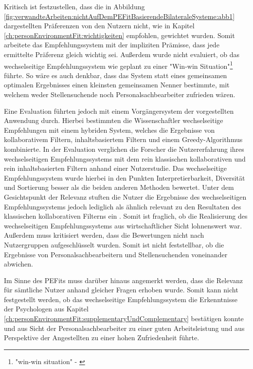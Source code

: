 Kritisch ist festzustellen, dass die in Abbildung \ref{fig:verwandteArbeiten:nichtAufDemPEFitBasierendeBilateraleSysteme:abb1} dargestellten Präferenzen von den Nutzern nicht, wie in Kapitel \ref{ch:personEnvironmentFit:wichtigkeiten} empfohlen, gewichtet wurden. Somit arbeitete das Empfehlungssystem mit der impliziten Prämisse, dass jede ermittelte Präferenz gleich wichtig sei. Außerdem wurde nicht evaluiert, ob das wechselseitige Empfehlungssystem wie geplant zu einer "Win-win Situation"\footnote{"win-win situation" - \textcite[S. 3, Z. 45f.]{wenxing:2015}} \cite[S. 3, Z. 45f.]{wenxing:2015} führte. So wäre es auch denkbar, dass das System statt eines gemeinsamen optimalen Ergebnisses einen kleinsten gemeinsamen Nenner bestimmte, mit welchem weder Stellensuchende noch Personalsachbearbeiter zufrieden wären.

Eine Evaluation führten jedoch \textcite[S. 1ff.]{hong:2013b} mit einem Vorgängersystem der vorgestellten Anwendung durch. Hierbei bestimmten die Wissenschaftler wechselseitige Empfehlungen mit einem hybriden System, welches die Ergebnisse von kollaborativem Filtern, inhaltsbasiertem Filtern und einem Greedy-Algorithmus kombinierte. In der Evaluation verglichen die Forscher die Nutzererfahrung ihres wechselseitigen Empfehlungssystems mit dem rein klassischen kollaborativen und rein inhaltsbasierten Filtern anhand einer Nutzerstudie. Das wechselseitige Empfehlungssystem wurde hierbei in den Punkten Interpretierbarkeit, Diversität und Sortierung besser als die beiden anderen Methoden bewertet. Unter dem Gesichtspunkt der Relevanz stuften die Nutzer die Ergebnisse des wechselseitigen Empfehlungssystems jedoch lediglich als ähnlich relevant zu den Resultaten des klassischen kollaborativen Filterns ein \cite[S. 1ff.]{hong:2013b}. Somit ist fraglich, ob die Realisierung des wechselseitigen Empfehlungssystems aus wirtschaftlicher Sicht lohnenswert war. Außerdem muss kritisiert werden, dass die Bewertungen nicht nach Nutzergruppen aufgeschlüsselt wurden. Somit ist nicht feststellbar, ob die Ergebnisse von Personalsachbearbeitern und Stellensuchenden voneinander abwichen.

Im Sinne des \acp{PEFit} muss darüber hinaus angemerkt werden, dass die Relevanz für sämtliche Nutzer anhand gleicher Fragen erhoben wurde. Somit kann nicht festgestellt werden, ob das wechselseitige Empfehlungssystem die Erkenntnisse der Psychologen aus Kapitel \ref{ch:personEnvironmentFit:supplementaryUndComplementary} bestätigen konnte und aus Sicht der Personalsachbearbeiter zu einer guten Arbeitsleistung und aus Perspektive der Angestellten zu einer hohen Zufriedenheit führte.

